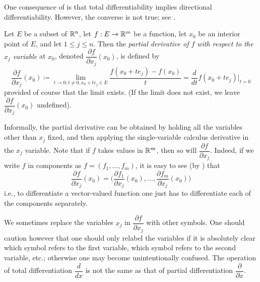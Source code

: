 \begin{rmk}\label{ii:6.3.6}
  One consequence of  is that total differentiability implies directional differentiability.
  However, the converse is not true;
  see .
\end{rmk}

\begin{defn}\label{ii:6.3.7}
  Let \(E\) be a subset of \(\mathbb{R}^n\), let \(f : E \to \mathbb{R}^m\) be a function, let \(x_0\) be an interior point of \(E\), and let \(1 \leq j \leq n\).
  Then the \emph{partial derivative of \(f\) with respect to the \(x_j\) variable} at \(x_0\), denoted \(\dfrac{\partial f}{\partial x_j}(x_0)\), is defined by
  \[
    \dfrac{\partial f}{\partial x_j}(x_0) \coloneqq \lim_{t \to 0 ; t \neq 0, x_0 + t e_j \in E} \dfrac{f(x_0 + t e_j) - f(x_0)}{t} = \dfrac{d}{dt} f(x_0 + t e_j)|_{t = 0}
  \]
  provided of course that the limit exists.
  (If the limit does not exist, we leave \(\dfrac{\partial f}{\partial x_j}(x_0)\) undefined).
\end{defn}

\begin{ac}\label{ii:ac:6.3.1}
  Informally, the partial derivative can be obtained by holding all the variables other than \(x_j\) fixed, and then applying the single-variable calculus derivative in the \(x_j\) variable.
  Note that if \(f\) takes values in \(\mathbb{R}^m\), then so will \(\dfrac{\partial f}{\partial x_j}\).
  Indeed, if we write \(f\) in components as \(f = (f_1, \dots, f_m)\), it is easy to see (by ) that
  \[
    \dfrac{\partial f}{\partial x_j}(x_0) = \bigg(\dfrac{\partial f_1}{\partial x_j}(x_0), \dots, \dfrac{\partial f_m}{\partial x_j}(x_0)\bigg)
  \]
  i.e., to differentiate a vector-valued function one just has to differentiate each of the components separately.
\end{ac}

\begin{note}
  We sometimes replace the variables \(x_j\) in \(\dfrac{\partial f}{\partial x_j}\) with other symbols.
  One should caution however that one should only relabel the variables if it is absolutely clear which symbol refers to the first variable, which symbol refers to the second variable, etc.;
  otherwise one may become unintentionally confused.
  The operation of total differentiation \(\dfrac{d}{dx}\) is not the same as that of partial differentiation \(\dfrac{\partial}{\partial x}\).
\end{note}

